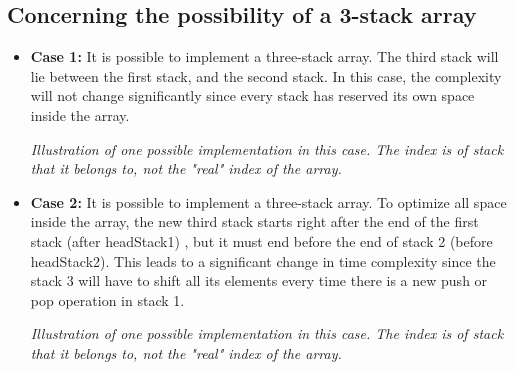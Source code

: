 \documentclass[16pt, letterpaper]{article}
\newcounter{nodeidx}
\newcommand{\nodes}[1]{%
    \foreach \num in {#1}{
      \node[minimum size=6mm, draw, rectangle] (\arabic{nodeidx}) at (\arabic{nodeidx},0) {\num};
      \stepcounter{nodeidx}
    }
    \setcounter{nodeidx}{1}
}
\newcommand{\brckt}[4]{%
  \draw (#1.south west) ++($(-.1, -.1) + (-.1*#3, 0)$) -- ++($(0,-.1) + (0,-#3*1.25em)$) -- node [below] {#4} ($(#2.south east) + (.1,-.1) + (.1*#3, 0) + (0,-.1) + (0,-#3*1.25em)$) -- ++($(0,#3*1.25em) + (0,.1)$);%
}
\begin{document}
\subsection{Concerning the possibility of a 3-stack array}
\begin{itemize}
    \item \textbf{Case 1:}
    It is possible to implement a three-stack array. The third stack will lie between the first stack, and the second stack. In this case, the complexity will not change significantly since every stack has reserved its own space inside the array.
    

\textit{Illustration of one possible implementation in this case. The index is of stack that it belongs to, not the "real" index of the array.}

    \item \textbf{Case 2:}
    It is possible to implement a three-stack array. To optimize all space inside the array, the new third stack starts right after the end of the first stack (after headStack1) , but it must end before the end of stack 2 (before headStack2). This leads to a significant change in time complexity since the stack 3 will have to shift all its elements every time there is a new push or pop operation in stack 1. 
    

\textit{Illustration of one possible implementation in this case. The index is of stack that it belongs to, not the "real" index of the array.}
\end{itemize}
\end{document}
